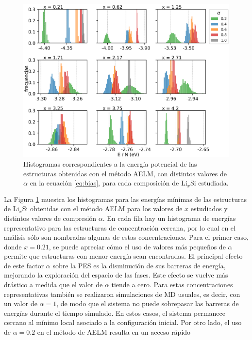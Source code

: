 \begin{figure}[h!]
    \centering
    \includegraphics[width=\textwidth]{Silicio/caracterizacion/resultados/introduccion/energias.png}
    \caption{Histogramas correspondientes a la energía potencial de las 
    estructuras obtenidas con el método AELM, con distintos valores de $\alpha$
    en la ecuación \ref{eq:bias}, para cada composición de Li$_x$Si estudiada.}
    \label{fig:energias}
\end{figure}
La Figura \ref{fig:energias} muestra los histogramas para las energías mínimas
de las estructuras de Li$_x$Si obtenidas con el método AELM para los valores de
$x$ estudiados y distintos valores de compresión $\alpha$. En cada fila hay un 
histograma de energías representativo para las estructuras de concentración 
cercana, por lo cual en el análisis sólo son nombradas algunas de estas 
concentraciones. Para el primer caso, donde $x = 0.21$, se puede apreciar cómo el 
uso de valores más pequeños de $\alpha$ permite que estructuras con menor energía 
sean encontradas. El principal efecto de este factor $\alpha$ sobre la PES es la 
disminución de sus barreras de energía, mejorando la exploración del espacio de 
las fases. Este efecto se vuelve más drástico a medida que el valor de $\alpha$ 
tiende a cero. Para estas concentraciones representativas también se realizaron 
simulaciones de MD usuales, es decir, con un valor de $\alpha = 1$, de modo que el sistema no 
puede sobrepasar las barreras de energías durante el tiempo simulado. En estos casos, el sistema 
permanece cercano al mínimo local asociado a la configuración inicial. Por otro 
lado, el uso de $\alpha = 0.2$ en el método de AELM resulta en un acceso rápido
